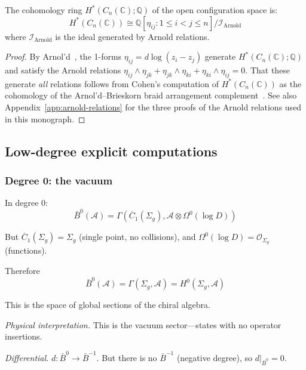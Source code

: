 \begin{corollary}\label{cor:cohomology-config}
The cohomology ring $H^*(C_n(\mathbb{C}); \mathbb{Q})$ of the open configuration space is:
\[H^*(C_n(\mathbb{C})) \cong \mathbb{Q}[\eta_{ij} : 1 \leq i < j \leq n] / \mathcal{I}_{\text{Arnold}}\]
where $\mathcal{I}_{\text{Arnold}}$ is the ideal generated by Arnold relations.
\end{corollary}

\begin{proof}
By Arnol'd~\cite{Arnold69}, the 1-forms $\eta_{ij} = d\log(z_i - z_j)$ generate $H^*(C_n(\mathbb{C}); \mathbb{Q})$ and satisfy the Arnold relations $\eta_{ij} \wedge \eta_{jk} + \eta_{jk} \wedge \eta_{ki} + \eta_{ki} \wedge \eta_{ij} = 0$.  That these generate \emph{all} relations follows from Cohen's computation of $H^*(C_n(\mathbb{C}))$ as the cohomology of the Arnol'd--Brieskorn braid arrangement complement~\cite{Coh76}.  See also Appendix~\ref{app:arnold-relations} for the three proofs of the Arnold relations used in this monograph.
\end{proof}

\subsection{Low-degree explicit computations}

\subsubsection{Degree 0: the vacuum}

\begin{computation}\label{comp:deg0}
In degree 0:
\[\bar{B}^0(\mathcal{A}) = \Gamma\left(\overline{C}_1(\Sigma_g), \mathcal{A} \otimes \Omega^0(\log D)\right)\]

But $\overline{C}_1(\Sigma_g) = \Sigma_g$ (single point, no collisions), and $\Omega^0(\log D) = \mathcal{O}_{\Sigma_g}$ (functions).

Therefore
\[\bar{B}^0(\mathcal{A}) = \Gamma(\Sigma_g, \mathcal{A}) = H^0(\Sigma_g, \mathcal{A})\]

This is the space of global sections of the chiral algebra.

\emph{Physical interpretation.} This is the vacuum sector---states with no operator insertions.

\emph{Differential.} $d: \bar{B}^0 \to \bar{B}^{-1}$. But there is no $\bar{B}^{-1}$ (negative degree), so $d|_{\bar{B}^0} = 0$.
\end{computation}

